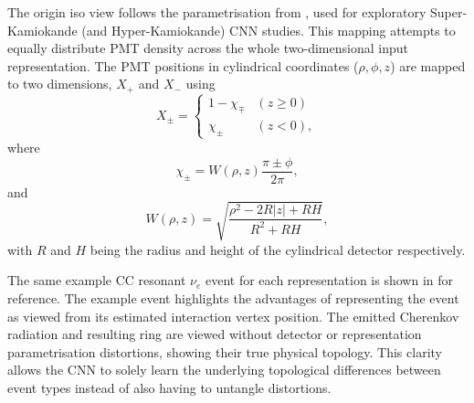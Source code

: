 The origin iso view follows the parametrisation from , used for
exploratory Super-Kamiokande (and Hyper-Kamiokande) CNN studies. This mapping attempts to equally
distribute PMT density across the whole two-dimensional input representation. The PMT positions in
cylindrical coordinates ($\rho,\phi,z$) are mapped to two dimensions, $X_{+}$ and $X_{-}$ using
\begin{equation} %
    X_{\pm}=
    \begin{cases}
        1-\chi_{\mp} & (z \geq 0) \\
        \chi_{\pm}   & (z < 0),
    \end{cases}
    \label{eq:iso_case}
\end{equation}
where
\begin{equation} %
    \chi_{\pm}=W(\rho,z)\frac{\pi\pm\phi}{2\pi},
    \label{eq:iso_main}
\end{equation}
and
\begin{equation} %
    W(\rho,z)=\sqrt{\frac{\rho^{2}-2R|z|+RH}{R^{2}+RH}},
    \label{eq:iso_part}
\end{equation}
with $R$ and $H$ being the radius and height of the cylindrical detector respectively.

The same example CC resonant $\nu_{e}$ event for each representation is shown in
 for reference. The example event highlights the
advantages of representing the event as viewed from its estimated interaction vertex position. The
emitted Cherenkov radiation and resulting ring are viewed without detector or representation
parametrisation distortions, showing their true physical topology. This clarity allows the CNN to
solely learn the underlying topological differences between event types instead of also having to
untangle distortions.

